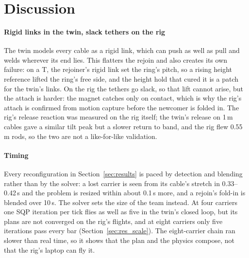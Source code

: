 \section{Discussion}
\label{sec:discussion}

\paragraph{Rigid links in the twin, slack tethers on the rig}
The twin models every cable as a rigid link, which can push as well as pull and welds wherever its end lies. This
flatters the rejoin and also creates its own failure: on a T, the rejoiner's rigid link set the ring's pitch, so a
rising height reference lifted the ring's free side, and the height hold that cured it is a patch for the twin's
links. On the rig the tethers go slack, so that lift cannot arise, but the attach is harder: the magnet catches only on
contact, which is why the rig's attach is confirmed from motion capture before the newcomer is folded in. The rig's
release reaction was measured on the rig itself; the twin's release on 1\,m cables gave a similar tilt peak but a
slower return to band, and the rig flew 0.55\,m rods, so the two are not a like-for-like validation.

\paragraph{Timing}
Every reconfiguration in Section~\ref{sec:results} is paced by detection and blending rather than by the solver: a
lost carrier is seen from its cable's stretch in 0.33--0.42\,s and the problem is resized within about 0.1\,s more,
and a rejoin's fold-in is blended over 10\,s. The solver sets the size of the team instead. At four carriers one SQP
iteration per tick flies as well as five in the twin's closed loop, but its plans are not converged on the rig's
flights, and at eight carriers only five iterations pass every bar (Section~\ref{sec:res_scale}). The eight-carrier
chain ran slower than real time, so it shows that the plan and the physics compose, not that the rig's laptop can fly
it.

